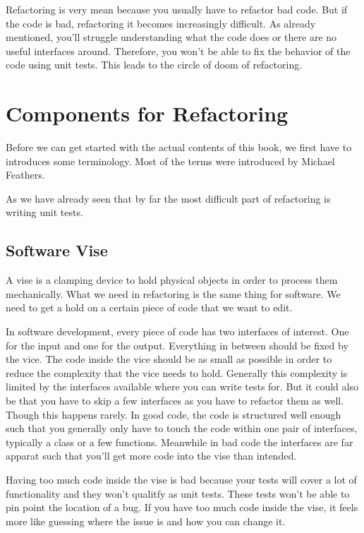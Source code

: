 Refactoring is very mean because you usually have to refactor bad code. But if the code is bad, refactoring it becomes increasingly difficult. As already mentioned, you'll struggle understanding what the code does or there are no useful interfaces around. Therefore, you won't be able to fix the behavior of the code using unit tests. This leads to the circle of doom of refactoring.

\section{Components for Refactoring}

Before we can get started with the actual contents of this book, we first have to introduces some terminology. Most of the terms were introduced by Michael Feathers.

As we have already seen that by far the most difficult part of refactoring is writing unit tests. 

\subsection{Software Vise}

A vise is a clamping device to hold physical objects in order to process them mechanically. What we need in refactoring is the same thing for software. We need to get a hold on a certain piece of code that we want to edit.

In software development, every piece of code has two interfaces of interest. One for the input and one for the output. Everything in between should be fixed by the vice. The code inside the vice should be as small as possible in order to reduce the complexity that the vice needs to hold. Generally this complexity is limited by the interfaces available where you can write tests for. But it could also be that you have to skip a few interfaces as you have to refactor them as well. Though this happens rarely. In good code, the code is structured well enough such that you generally only have to touch the code within one pair of interfaces, typically a class or a few functions. Meanwhile in bad code the interfaces are far apparat such that you'll get more code into the vise than intended.

Having too much code inside the vise is bad because your tests will cover a lot of functionality and they won't qualitfy as unit tests. These tests won't be able to pin point the location of a bug. If you have too much code inside the vise, it feels more like guessing where the issue is and how you can change it.

